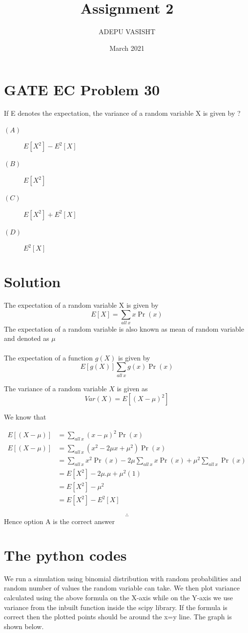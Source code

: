 \documentclass[journal,12pt,twocolumn]{IEEEtran}
\title{Assignment 2}
\author{ADEPU VASISHT}
\date{March 2021}
\providecommand{\brak}[1]{\ensuremath{\left(#1\right)}}
\begin{document}
\maketitle

\section*{GATE EC Problem 30}
If E denotes the expectation, the variance of a random variable X is given by ?

\begin{description}
\item[$\brak{A}$]$E[X^2]-E^2[X]$ 
\item[$\brak{B}$]$E[X^2]$
\item[$\brak{C}$]$E[X^2]+E^2[X]$ 
\item[$\brak{D}$]$E^2[X]$
\end{description}
\section*{Solution}
The expectation of a random variable X is given by $$E[X]=\sum_{all \ x}x\Pr\brak{x}$$
The expectation of a random variable is also known as mean of random variable and denoted as $\mu$\\\\
The expectation of a function $g\brak{X}$ is given by $$E[g\brak{X}]\sum_{all \ x}g\brak{x}\Pr\brak{x}$$

The variance of a random variable $X$ is given as $$Var\brak{X}=E[\brak{X-\mu}^2]$$

We know that



\begin{align}
    E[\brak{X-\mu}] &= \sum_{all \ x} \brak{x-\mu}^2 \Pr\brak{x}\\
    E[\brak{X-\mu}] &= \sum_{all \ x} \brak{x^2-2\mu x+\mu^2} \Pr\brak{x}\\
    &= \sum_{all \ x}x^2\Pr\brak{x}-2\mu\sum_{all\ x}x\Pr\brak{x}+\mu^2\sum_{all\ x}\Pr\brak{x}\\
    &= E[X^2]-2\mu.\mu+\mu^2\brak{1}\\
    &= E[X^2]-\mu^2\\
    &= E[X^2]-E^2[X]
\end{align}

$$\therefore$$ Hence option A is the correct answer

\section*{The python codes}
We run a simulation using binomial distribution with random probabilities and random number of values the random variable can take. We then plot variance calculated using the above formula on the X-axis while on the Y-axis we use variance from the inbuilt function inside the scipy library. If the formula is correct then the plotted points should be around the x=y line. The graph is shown below.
\end{document}
